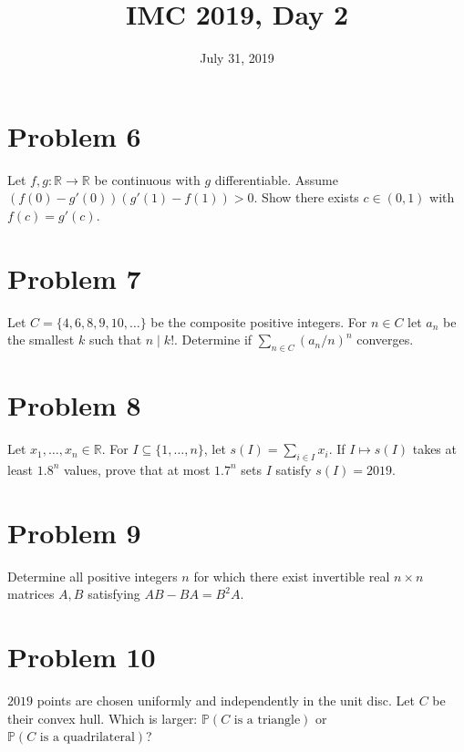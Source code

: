 \documentclass{article}
\title{IMC 2019, Day 2}
\date{July 31, 2019}
\begin{document}
\maketitle

\section*{Problem 6}
Let $f, g: \mathbb{R} \to \mathbb{R}$ be continuous with $g$ differentiable. Assume $(f(0) - g'(0))(g'(1) - f(1)) > 0$. Show there exists $c \in (0, 1)$ with $f(c) = g'(c)$.

\section*{Problem 7}
Let $C = \{4, 6, 8, 9, 10, \ldots\}$ be the composite positive integers. For $n \in C$ let $a_n$ be the smallest $k$ such that $n \mid k!$. Determine if $\sum_{n \in C} (a_n/n)^n$ converges.

\section*{Problem 8}
Let $x_1, \ldots, x_n \in \mathbb{R}$. For $I \subseteq \{1, \ldots, n\}$, let $s(I) = \sum_{i \in I} x_i$. If $I \mapsto s(I)$ takes at least $1.8^n$ values, prove that at most $1.7^n$ sets $I$ satisfy $s(I) = 2019$.

\section*{Problem 9}
Determine all positive integers $n$ for which there exist invertible real $n \times n$ matrices $A, B$ satisfying $AB - BA = B^2 A$.

\section*{Problem 10}
$2019$ points are chosen uniformly and independently in the unit disc. Let $C$ be their convex hull. Which is larger: $\mathbb{P}(C \text{ is a triangle})$ or $\mathbb{P}(C \text{ is a quadrilateral})$?
\end{document}
